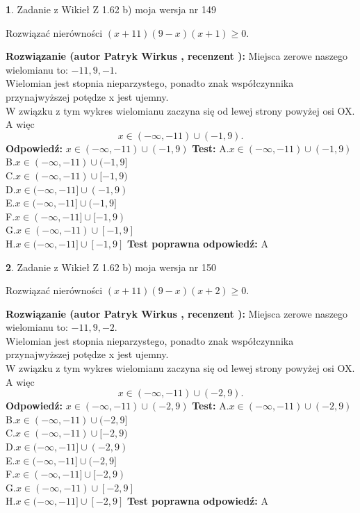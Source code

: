 \documentclass[12pt, a4paper]{article}
\theoremstyle{definition} %
\newtheorem{zad}{}
\newcommand{\zadStart}[1]{\begin{zad}#1\newline}
\newcommand{\zadStop}{\end{zad}}
\newcommand{\rozwStart}[2]{\noindent \textbf{Rozwiązanie (autor #1 , recenzent #2): }\newline}
\newcommand{\rozwStop}{\newline}
\newcommand{\odpStart}{\noindent \textbf{Odpowiedź:}\newline}
\newcommand{\odpStop}{\newline}
\newcommand{\testStart}{\noindent \textbf{Test:}\newline}
\newcommand{\testStop}{\newline}
\newcommand{\kluczStart}{\noindent \textbf{Test poprawna odpowiedź:}\newline}
\newcommand{\kluczStop}{\newline}
\begin{document}
\zadStart{Zadanie z Wikieł Z 1.62 b) moja wersja nr 149}

Rozwiązać nierówności $(x+11)(9-x)(x+1)\ge0$.
\zadStop
\rozwStart{Patryk Wirkus}{}
Miejsca zerowe naszego wielomianu to: $-11, 9, -1$.\\
Wielomian jest stopnia nieparzystego, ponadto znak współczynnika przy\linebreak najwyższej potędze x jest ujemny.\\ W związku z tym wykres wielomianu zaczyna się od lewej strony powyżej osi OX. A więc $$x \in (-\infty,-11) \cup (-1,9).$$
\rozwStop
\odpStart
$x \in (-\infty,-11) \cup (-1,9)$
\odpStop
\testStart
A.$x \in (-\infty,-11) \cup (-1,9)$\\
B.$x \in (-\infty,-11) \cup (-1,9]$\\
C.$x \in (-\infty,-11) \cup [-1,9)$\\
D.$x \in (-\infty,-11] \cup (-1,9)$\\
E.$x \in (-\infty,-11] \cup (-1,9]$\\
F.$x \in (-\infty,-11] \cup [-1,9)$\\
G.$x \in (-\infty,-11) \cup [-1,9]$\\
H.$x \in (-\infty,-11] \cup [-1,9]$
\testStop
\kluczStart
A
\kluczStop



\zadStart{Zadanie z Wikieł Z 1.62 b) moja wersja nr 150}

Rozwiązać nierówności $(x+11)(9-x)(x+2)\ge0$.
\zadStop
\rozwStart{Patryk Wirkus}{}
Miejsca zerowe naszego wielomianu to: $-11, 9, -2$.\\
Wielomian jest stopnia nieparzystego, ponadto znak współczynnika przy\linebreak najwyższej potędze x jest ujemny.\\ W związku z tym wykres wielomianu zaczyna się od lewej strony powyżej osi OX. A więc $$x \in (-\infty,-11) \cup (-2,9).$$
\rozwStop
\odpStart
$x \in (-\infty,-11) \cup (-2,9)$
\odpStop
\testStart
A.$x \in (-\infty,-11) \cup (-2,9)$\\
B.$x \in (-\infty,-11) \cup (-2,9]$\\
C.$x \in (-\infty,-11) \cup [-2,9)$\\
D.$x \in (-\infty,-11] \cup (-2,9)$\\
E.$x \in (-\infty,-11] \cup (-2,9]$\\
F.$x \in (-\infty,-11] \cup [-2,9)$\\
G.$x \in (-\infty,-11) \cup [-2,9]$\\
H.$x \in (-\infty,-11] \cup [-2,9]$
\testStop
\kluczStart
A
\kluczStop
\end{document}
